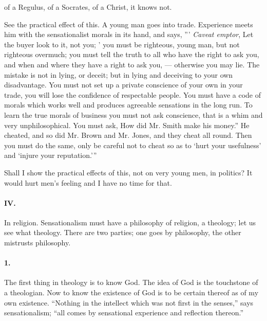 \documentclass[12pt]{article}
\begin{document}

of a Regulus, of a Socrates, of a Christ, it knows not. 

See the practical effect of this. A young man goes 
into trade. Experience meets him with the sensationalist morals in its hand, and says, {''}' \emph{Caveat emptor}, Let 
the buyer look to it, not you; ' you must be righteous, 
young man, but not righteous overmuch; you must tell 
the truth to all who have the right to ask you, and when 
and where they have a right to ask you, --- otherwise 
you may lie. The mistake is not in lying, or deceit; 
but in lying and deceiving to your own disadvantage. 
You must not set up a private conscience of your own 
in your trade, you will lose the confidence of respectable people. You must have a code of morals which 
works well and produces agreeable sensations in the 
long run. To learn the true morals of business you 
must not ask conscience, that is a whim and very unphilosophical. You must ask, How did Mr. Smith 
make his money.'' He cheated, and so did Mr. Brown 
and Mr. Jones, and they cheat all round. Then you 
must do the same, only be careful not to cheat so as to 
`hurt your usefulness' and `injure your reputation.'{''} 

Shall I show the practical effects of this, not on very 
young men, in politics? It would hurt men's feeling 
and I have no time for that. 

\paragraph{IV.} In religion. Sensationalism must have a philosophy of religion, a theology; let us see what theology. 
There are two parties; one goes by philosophy, the 
other mistrusts philosophy. 

\paragraph{1.} The first thing in theology is to know God. The 
idea of God is the touchstone of a theologian. Now to 
know the existence of God is to be certain thereof as of 
my own existence. ``Nothing in the intellect which 
was not first in the senses,'' says sensationalism; ``all 
comes by sensational experience and reflection thereon.'' 


\end{document}
